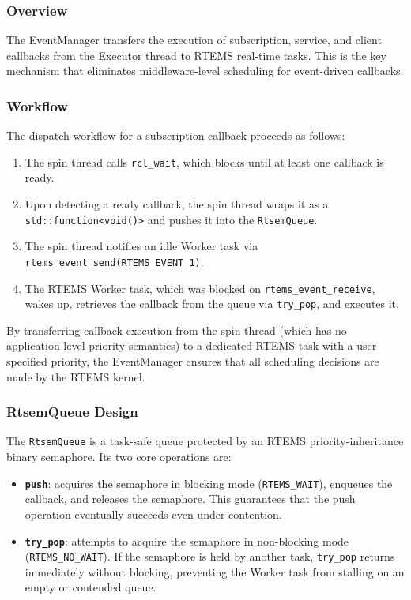\subsubsection{Overview}

The EventManager transfers the execution of subscription, service, and client callbacks from the Executor thread to RTEMS real-time tasks.  This is the key mechanism that eliminates middleware-level scheduling for event-driven callbacks.

\subsubsection{Workflow}

The dispatch workflow for a subscription callback proceeds as follows:

\begin{enumerate}
    \item The spin thread calls \texttt{rcl\_wait}, which blocks until at least one callback is ready.
    \item Upon detecting a ready callback, the spin thread wraps it as a \texttt{std::function<void()>} and pushes it into the \texttt{RtsemQueue}.
    \item The spin thread notifies an idle Worker task via \texttt{rtems\_event\_send(RTEMS\_EVENT\_1)}.
    \item The RTEMS Worker task, which was blocked on \texttt{rtems\_event\_receive}, wakes up, retrieves the callback from the queue via \texttt{try\_pop}, and executes it.
\end{enumerate}

By transferring callback execution from the spin thread (which has no application-level priority semantics) to a dedicated RTEMS task with a user-specified priority, the EventManager ensures that all scheduling decisions are made by the RTEMS kernel.

\subsubsection{RtsemQueue Design}

The \texttt{RtsemQueue} is a task-safe queue protected by an RTEMS priority-inheritance binary semaphore.  Its two core operations are:

\begin{itemize}
    \item \textbf{\texttt{push}}: acquires the semaphore in blocking mode (\texttt{RTEMS\_WAIT}), enqueues the callback, and releases the semaphore.  This guarantees that the push operation eventually succeeds even under contention.
    \item \textbf{\texttt{try\_pop}}: attempts to acquire the semaphore in non-blocking mode (\texttt{RTEMS\_NO\_WAIT}).  If the semaphore is held by another task, \texttt{try\_pop} returns immediately without blocking, preventing the Worker task from stalling on an empty or contended queue.
\end{itemize}

